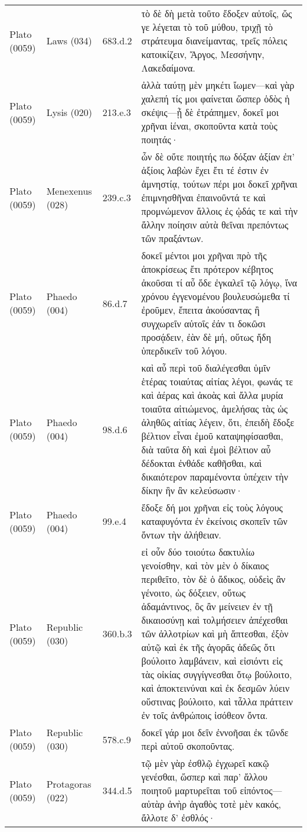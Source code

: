 \begin{longtable}{llll}
Plato (0059) & Laws (034) & 683.d.2 & τὸ δὲ δὴ μετὰ τοῦτο ἔδοξεν αὐτοῖς, ὥς γε λέγεται τὸ τοῦ μύθου, τριχῇ τὸ στράτευμα διανείμαντας, τρεῖς πόλεις κατοικίζειν, Ἄργος, Μεσσήνην, Λακεδαίμονα.\\
Plato (0059) & Lysis (020) & 213.e.3 & ἀλλὰ ταύτῃ μὲν μηκέτι ἴωμεν—καὶ γὰρ χαλεπή τίς μοι φαίνεται ὥσπερ ὁδὸς ἡ σκέψις—ᾗ δὲ ἐτράπημεν, δοκεῖ μοι χρῆναι ἰέναι, σκοποῦντα κατὰ τοὺς ποιητάς·\\
\addlinespace
Plato (0059) & Menexenus (028) & 239.c.3 & ὧν δὲ οὔτε ποιητής πω δόξαν ἀξίαν ἐπ’ ἀξίοις λαβὼν ἔχει ἔτι τέ ἐστιν ἐν ἀμνηστίᾳ, τούτων πέρι μοι δοκεῖ χρῆναι ἐπιμνησθῆναι ἐπαινοῦντά τε καὶ προμνώμενον ἄλλοις ἐς ᾠδάς τε καὶ τὴν ἄλλην ποίησιν αὐτὰ θεῖναι πρεπόντως τῶν πραξάντων.\\
Plato (0059) & Phaedo (004) & 86.d.7 & δοκεῖ μέντοι μοι χρῆναι πρὸ τῆς ἀποκρίσεως ἔτι πρότερον κέβητος ἀκοῦσαι τί αὖ ὅδε ἐγκαλεῖ τῷ λόγῳ, ἵνα χρόνου ἐγγενομένου βουλευσώμεθα τί ἐροῦμεν, ἔπειτα ἀκούσαντας ἢ συγχωρεῖν αὐτοῖς ἐάν τι δοκῶσι προσᾴδειν, ἐὰν δὲ μή, οὕτως ἤδη ὑπερδικεῖν τοῦ λόγου.\\
Plato (0059) & Phaedo (004) & 98.d.6 & καὶ αὖ περὶ τοῦ διαλέγεσθαι ὑμῖν ἑτέρας τοιαύτας αἰτίας λέγοι, φωνάς τε καὶ ἀέρας καὶ ἀκοὰς καὶ ἄλλα μυρία τοιαῦτα αἰτιώμενος, ἀμελήσας τὰς ὡς ἀληθῶς αἰτίας λέγειν, ὅτι, ἐπειδὴ ἔδοξε βέλτιον εἶναι ἐμοῦ καταψηφίσασθαι, διὰ ταῦτα δὴ καὶ ἐμοὶ βέλτιον αὖ δέδοκται ἐνθάδε καθῆσθαι, καὶ δικαιότερον παραμένοντα ὑπέχειν τὴν δίκην ἣν ἂν κελεύσωσιν·\\
Plato (0059) & Phaedo (004) & 99.e.4 & ἔδοξε δή μοι χρῆναι εἰς τοὺς λόγους καταφυγόντα ἐν ἐκείνοις σκοπεῖν τῶν ὄντων τὴν ἀλήθειαν.\\
Plato (0059) & Republic (030) & 360.b.3 & εἰ οὖν δύο τοιούτω δακτυλίω γενοίσθην, καὶ τὸν μὲν ὁ δίκαιος περιθεῖτο, τὸν δὲ ὁ ἄδικος, οὐδεὶς ἂν γένοιτο, ὡς δόξειεν, οὕτως ἀδαμάντινος, ὃς ἂν μείνειεν ἐν τῇ δικαιοσύνῃ καὶ τολμήσειεν ἀπέχεσθαι τῶν ἀλλοτρίων καὶ μὴ ἅπτεσθαι, ἐξὸν αὐτῷ καὶ ἐκ τῆς ἀγορᾶς ἀδεῶς ὅτι βούλοιτο λαμβάνειν, καὶ εἰσιόντι εἰς τὰς οἰκίας συγγίγνεσθαι ὅτῳ βούλοιτο, καὶ ἀποκτεινύναι καὶ ἐκ δεσμῶν λύειν οὕστινας βούλοιτο, καὶ τἆλλα πράττειν ἐν τοῖς ἀνθρώποις ἰσόθεον ὄντα.\\
\addlinespace
Plato (0059) & Republic (030) & 578.c.9 & δοκεῖ γάρ μοι δεῖν ἐννοῆσαι ἐκ τῶνδε περὶ αὐτοῦ σκοποῦντας.\\
Plato (0059) & Protagoras (022) & 344.d.5 & τῷ μὲν γὰρ ἐσθλῷ ἐγχωρεῖ κακῷ γενέσθαι, ὥσπερ καὶ παρ’ ἄλλου ποιητοῦ μαρτυρεῖται τοῦ εἰπόντος—αὐτὰρ ἀνὴρ ἀγαθὸς τοτὲ μὲν κακός, ἄλλοτε δ’ ἐσθλός·\\

\end{longtable}
